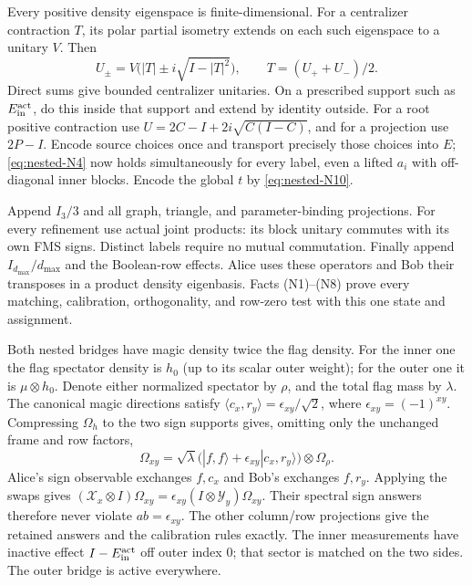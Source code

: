 Every positive density eigenspace is finite-dimensional. For a
centralizer contraction $T$, its polar partial isometry extends on
each such eigenspace to a unitary $V$. Then
\begin{equation}
 U_\pm=V\bigl(|T|\pm i\sqrt{I-|T|^2}\bigr),\qquad
                         T=(U_++U_-)/2.                     \label{eq:nested-N10}
\end{equation}
Direct sums give bounded centralizer unitaries. On a prescribed
support such as ${E^{\rm act}_{\rm in}}$, do this inside that support and extend by identity
outside. For a root positive contraction use
$U=2C-I+2i\sqrt{C(I-C)}$, and for a projection use $2P-I$.
Encode source choices once and transport precisely those choices into
$E$; \eqref{eq:nested-N4} now holds simultaneously for every label, even a lifted
$a_i$ with off-diagonal inner blocks. Encode the global $t$ by \eqref{eq:nested-N10}.

Append $I_3/3$ and all graph, triangle, and parameter-binding
projections. For every refinement use actual joint products: its
block unitary commutes with its own FMS signs. Distinct labels require
no mutual commutation. Finally append $I_{d_{\max}}/d_{\max}$ and the
Boolean-row effects. Alice uses these operators and Bob their
transposes in a product density eigenbasis. Facts (N1)--(N8) prove every
matching, calibration, orthogonality, and row-zero test with this one
state and assignment.

Both nested bridges have magic density twice the
flag density. For the inner one the flag spectator density is $h_0$
(up to its scalar outer weight); for the outer one it is
$\mu\otimes h_0$. Denote either normalized spectator by $\rho$,
and the total flag mass by $\lambda$. The canonical magic directions
satisfy $\langle c_x,r_y\rangle=\epsilon_{xy}/\sqrt2$, where
$\epsilon_{xy}=(-1)^{xy}$. Compressing $\Omega_h$ to the two sign
supports gives, omitting only the unchanged frame and row factors,
\[
 \Omega_{xy}=\sqrt\lambda\bigl(|f,f\rangle+
            \epsilon_{xy}|c_x,r_y\rangle\bigr)\otimes\Omega_\rho.
\]
Alice's sign observable exchanges $f,c_x$ and Bob's exchanges $f,r_y$.
Applying the swaps gives
$(\mathcal X_x\otimes I)\Omega_{xy}
=\epsilon_{xy}(I\otimes\mathcal Y_y)\Omega_{xy}$.
Their spectral sign answers therefore never violate $ab=\epsilon_{xy}$.
The other column/row projections give the retained answers and the
calibration rules exactly. The inner measurements have inactive
effect $I-{E^{\rm act}_{\rm in}}$ off outer index $0$; that sector is matched on the two
sides. The outer bridge is active everywhere.

